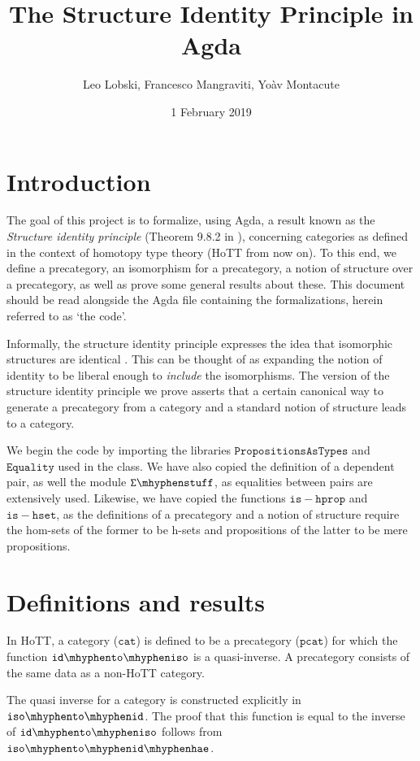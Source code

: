 \documentclass{article}
\title{The Structure Identity Principle in Agda}
\author{Leo Lobski, Francesco Mangraviti, Yo\` av Montacute}
\date{1 February 2019}
\begin{document}
\maketitle

\section*{Introduction}
 The goal of this project is to formalize, using Agda, a result known as the {\em Structure identity principle} (Theorem 9.8.2 in \cite{hott-book}), concerning categories as defined in the context of homotopy type theory (HoTT from now on). To this end, we define a precategory, an isomorphism for a precategory, a notion of structure over a precategory, as well as prove some general results about these. This document should be read alongside the Agda file containing the formalizations, herein referred to as `the code'.
  
Informally, the structure identity principle expresses the idea that isomorphic structures are identical \cite[p.~327]{hott-book}. This can be thought of as expanding the notion of identity to be liberal enough to {\em include} the isomorphisms. The version of the structure identity principle we prove asserts that a certain canonical way to generate a precategory from a category and a standard notion of structure leads to a category.

We begin the code by importing the libraries $\mathtt{PropositionsAsTypes}$ and $\mathtt{Equality}$ used in the class. We have also copied the definition of a dependent pair, as well the module $\mathtt{\Sigma \mhyphen stuff}$, as equalities between pairs are extensively used. Likewise, we have copied the functions $\mathtt{is-hprop}$ and $\mathtt{is-hset}$, as the definitions of a precategory and a notion of structure require the hom-sets of the former to be h-sets and propositions of the latter to be mere propositions.

\section*{Definitions and results}
In HoTT, a category ($\mathtt{cat}$) is defined to be a precategory ($\mathtt{pcat}$) for which the function $\mathtt{id \mhyphen to \mhyphen iso}$ is a quasi-inverse. A precategory consists of the same data as a non-HoTT category.

The quasi inverse for a category is constructed explicitly in $\mathtt{iso \mhyphen to \mhyphen id}$. The proof that this function is equal to the inverse of $\mathtt{id \mhyphen to \mhyphen iso}$ follows from $\mathtt{iso \mhyphen to \mhyphen id \mhyphen hae}$.
\end{document}
